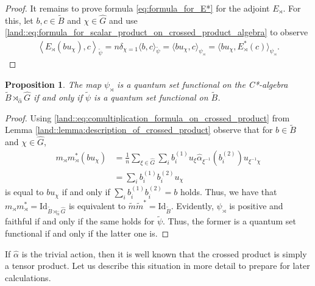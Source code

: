 \documentclass{amsart}
\newtheorem{proposition}[thm]{Proposition}
\theoremstyle{definition}
\theoremstyle{definition}
\begin{document}
\begin{proof}
    It remains to prove formula \eqref{eq:formula_for_E*} for the adjoint $E_\rtimes$. For this, let $b, c \in \tilde{B}$ and $\chi \in \hat{G}$ and use \eqref{land::eq:formula_for_scalar_product_on_crossed_product_algebra} to observe
    \begin{align*}
        \left\langle E_\rtimes\left(b u_\chi\right), c \right\rangle_{\tilde{\psi}} 
            = n \delta_{\chi=1} \langle b, c \rangle_{\tilde{\psi}}
            = \langle b u_\chi, c \rangle_{\psi_\rtimes}
            = \langle b u_\chi, E_\rtimes^\ast(c) \rangle_{\psi_\rtimes}.
    \end{align*}
\end{proof}

\begin{proposition}
    \label{crossed::prop:qset_functional_on_crossed_product}
    The map $\psi_\rtimes$ is a quantum set functional on the C*-algebra $\tilde{B} \rtimes_{\hat{\alpha}} \hat{G}$ if and only if $\tilde{\psi}$ is a quantum set functional on $\tilde{B}$.
\end{proposition}

\begin{proof}
    Using \eqref{land::eq:comultiplication_formula_on_crossed_product} from Lemma \ref{land::lemma:description_of_crossed_product} observe that for $b \in \tilde{B}$ and $\chi \in \hat{G}$,
    \begin{align*}
        m_\rtimes m_\rtimes^\ast\left(b u_\chi \right)
            &= \frac{1}{n} \sum_{\xi \in \hat{G}} \sum_i b_i^{(1)} u_\xi \hat{\alpha}_{\xi^{-1}}(b_i^{(2)}) u_{\xi^{-1} \chi} \\
            &= \sum_i b_i^{(1)} b_i^{(2)} u_\chi
    \end{align*}
    is equal to $b u_\chi$ if and only if $\sum_i b_i^{(1)} b_i^{(2)} = b$ holds. Thus, we have that $m_\rtimes m_\rtimes^\ast = \mathrm{Id}_{\tilde{B} \rtimes_{\hat{\alpha}} \hat{G}}$ is equivalent to $\tilde{m} \tilde{m}^\ast = \mathrm{Id}_{\tilde{B}}$. Evidently, $\psi_\rtimes$ is positive and faithful if and only if the same holds for $\tilde{\psi}$. Thus, the former is a quantum set functional if and only if the latter one is.
\end{proof}

If $\hat{\alpha}$ is the trivial action, then it is well known that the crossed product is simply a tensor product. Let us describe this situation in more detail to prepare for later calculations.
\end{document}
